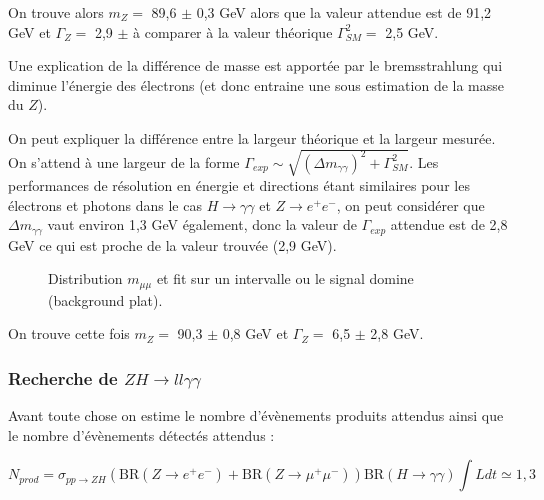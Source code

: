 \documentclass[11pt]{article} %
\begin{document}
On trouve alors $m_Z =$  89,6 $\pm$ 0,3 GeV alors que la valeur attendue est de 91,2 GeV et $\Gamma_Z =$ 2,9 $\pm$ à comparer à la valeur théorique $\Gamma_{SM}^2 =$ 2,5 GeV.


Une explication de la différence de masse est apportée par le bremsstrahlung qui diminue l'énergie des électrons (et donc entraine une sous estimation de la masse du $Z$).

On peut expliquer la différence entre la largeur théorique et la largeur mesurée. On s'attend à une largeur de la forme $\Gamma_{exp} \sim \sqrt{(\Delta m_{\gamma \gamma})^2 + \Gamma_{SM}^2}$. Les performances de résolution en énergie et directions étant similaires pour les électrons et photons dans le cas $H \to \gamma \gamma$ et $Z\to e^+e^-$, on peut considérer que $\Delta m_{\gamma \gamma} $ vaut environ 1,3 GeV également, donc la valeur de $\Gamma_{exp}$ attendue est de 2,8 GeV ce qui est proche de la valeur trouvée (2,9 GeV).

\begin{figure}[H]
\centering
  \caption{Distribution $m_{\mu\mu}$ et fit sur un intervalle ou le signal domine (background plat).  }
\label{fig:distribution_mmumu}
 \resizebox{.8\linewidth}{!}{}
\end{figure}

On trouve cette fois $m_Z =$  90,3 $\pm$ 0,8 GeV et $\Gamma_Z =$ 6,5 $\pm$ 2,8 GeV. 

\subsubsection{Recherche de $ZH \to ll\gamma\gamma$}

Avant toute chose on estime le nombre d'évènements produits attendus ainsi que le nombre d'évènements détectés attendus :

\begin{equation}
N_{prod} = \sigma_{pp\to ZH} \left( \mbox{BR}(Z\to e^+e^- ) + \mbox{BR}(Z\to\mu^+\mu^- )\right) \mbox{BR}(H\to\gamma\gamma) \int L dt \simeq 1,3 
\end{equation}
\end{document}
